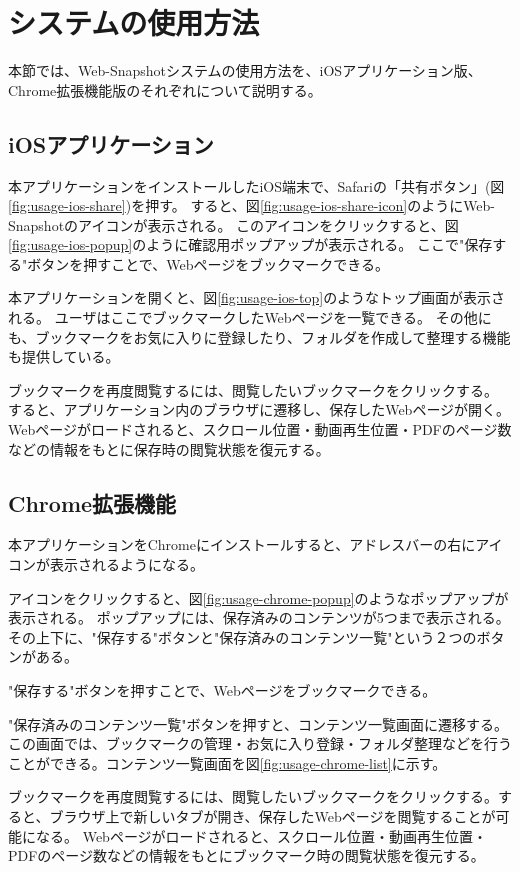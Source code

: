 \section{システムの使用方法}
本節では、Web-Snapshotシステムの使用方法を、iOSアプリケーション版、Chrome拡張機能版のそれぞれについて説明する。

\subsection{iOSアプリケーション}
本アプリケーションをインストールしたiOS端末で、Safariの「共有ボタン」(図\ref{fig:usage-ios-share})を押す。
すると、図\ref{fig:usage-ios-share-icon}のようにWeb-Snapshotのアイコンが表示される。
このアイコンをクリックすると、図\ref{fig:usage-ios-popup}のように確認用ポップアップが表示される。
ここで"保存する"ボタンを押すことで、Webページをブックマークできる。

本アプリケーションを開くと、図\ref{fig:usage-ios-top}のようなトップ画面が表示される。
ユーザはここでブックマークしたWebページを一覧できる。
その他にも、ブックマークをお気に入りに登録したり、フォルダを作成して整理する機能も提供している。

ブックマークを再度閲覧するには、閲覧したいブックマークをクリックする。
すると、アプリケーション内のブラウザに遷移し、保存したWebページが開く。
Webページがロードされると、スクロール位置・動画再生位置・PDFのページ数などの情報をもとに保存時の閲覧状態を復元する。

\subsection{Chrome拡張機能}
本アプリケーションをChromeにインストールすると、アドレスバーの右にアイコンが表示されるようになる。

アイコンをクリックすると、図\ref{fig:usage-chrome-popup}のようなポップアップが表示される。
ポップアップには、保存済みのコンテンツが5つまで表示される。
その上下に、"保存する"ボタンと"保存済みのコンテンツ一覧"という２つのボタンがある。

"保存する"ボタンを押すことで、Webページをブックマークできる。



"保存済みのコンテンツ一覧"ボタンを押すと、コンテンツ一覧画面に遷移する。
この画面では、ブックマークの管理・お気に入り登録・フォルダ整理などを行うことができる。コンテンツ一覧画面を図\ref{fig:usage-chrome-list}に示す。



ブックマークを再度閲覧するには、閲覧したいブックマークをクリックする。すると、ブラウザ上で新しいタブが開き、保存したWebページを閲覧することが可能になる。
Webページがロードされると、スクロール位置・動画再生位置・PDFのページ数などの情報をもとにブックマーク時の閲覧状態を復元する。

